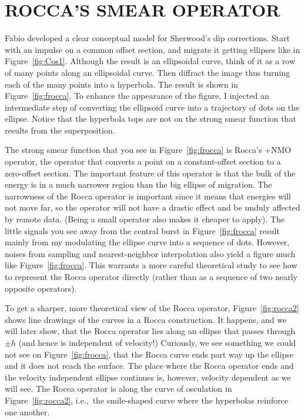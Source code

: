 \section{ROCCA'S SMEAR OPERATOR}
Fabio  developed
a clear conceptual model for Sherwood's dip corrections.
Start with an impulse on a common offset section,
and migrate it getting ellipses like in Figure~\ref{fig:Cos1}.
Although the result is an ellipsoidal curve,
think of it as a row of many points along an ellipsoidal curve.
Then diffract the image
thus turning each of the many points into a hyperbola.
The result is shown in Figure~\ref{fig:frocca}.
To enhance the appearance of the figure,
I injected an intermediate step of converting the ellipsoid
curve into a trajectory of dots on the ellipse.
Notice that the hyperbola tops
are not on the strong smear function that results
from the superposition.

\par
The strong smear function that you see in Figure~\ref{fig:frocca}
is Rocca's +NMO operator,
the operator that converts a point on a constant-offset section
to a zero-offset section.
The important feature of this operator is that
the bulk of the energy is in a much narrower region
than the big ellipse of migration.
The narrowness of the Rocca operator is important
since it means that energies will not move far,
so the operator will not have a drastic effect
and be unduly affected by remote data.
(Being a small operator also makes it cheaper to apply).
The little signals you see away from the central burst
in Figure~\ref{fig:frocca} result mainly from
my modulating the ellipse curve into a sequence of dots.
However, noises from sampling and nearest-neighbor interpolation
also yield a figure much like Figure~\ref{fig:frocca}.
This warrants a more careful theoretical study
to see how to represent the Rocca operator
directly (rather than as a sequence of two nearly opposite operators).
\par
{}
To get a sharper, more theoretical view of the Rocca operator,
Figure~\ref{fig:rocca2} shows line drawings of the curves in
a Rocca construction.
It happens, and we will later show,
that the Rocca operator lies along an ellipse
that passes through $\pm h$
(and hence is independent of velocity!)
Curiously,
we see something we could not see on Figure~\ref{fig:frocca},
that the Rocca curve ends part way up the ellipse
and it does not reach the surface.
The place where the Rocca operator ends
and the velocity independent ellipse continues is, however,
velocity dependent as we will see.
The Rocca operator is along the curve of osculation in Figure~\ref{fig:rocca2},
i.e.,~the smile-shaped curve where the hyperbolas reinforce one another.

